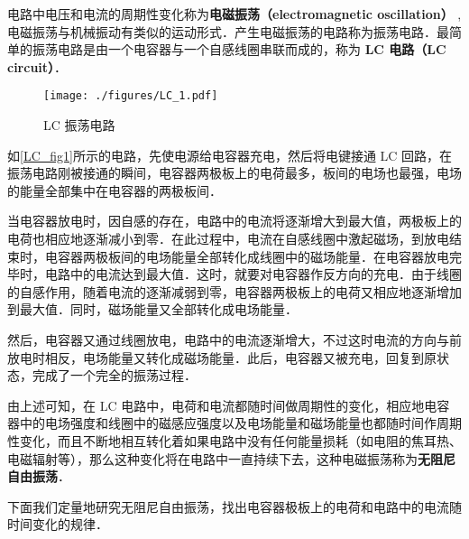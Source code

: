 
电路中电压和电流的周期性变化称为\textbf{电磁振荡（electromagnetic oscillation）} , 电磁振荡与机械振动有类似的运动形式．产生电磁振荡的电路称为振荡电路．最简单的振荡电路是由一个电容器与一个自感线圈串联而成的，称为\textbf{ LC 电路（LC circuit）}．
\begin{figure}[ht]
\centering
\texttt{[image: ./figures/LC\_1.pdf]}
\caption{LC 振荡电路} \label{LC_fig1}
\end{figure}

如\autoref{LC_fig1}所示的电路，先使电源给电容器充电，然后将电键接通 LC 回路，在振荡电路刚被接通的瞬间，电容器两极板上的电荷最多，板间的电场也最强，电场的能量全部集中在电容器的两极板间．

当电容器放电时，因自感的存在，电路中的电流将逐渐增大到最大值，两极板上的电荷也相应地逐渐减小到零．在此过程中，电流在自感线圈中激起磁场，到放电结束时，电容器两极板间的电场能量全部转化成线圈中的磁场能量．在电容器放电完毕时，电路中的电流达到最大值．这时，就要对电容器作反方向的充电．由于线圈的自感作用，随着电流的逐渐减弱到零，电容器两极板上的电荷又相应地逐渐增加到最大值．同时，磁场能量又全部转化成电场能量．

然后，电容器又通过线圈放电，电路中的电流逐渐增大，不过这时电流的方向与前放电时相反，电场能量又转化成磁场能量．此后，电容器又被充电，回复到原状态，完成了一个完全的振荡过程．

由上述可知，在 LC 电路中，电荷和电流都随时间做周期性的变化，相应地电容器中的电场强度和线圈中的磁感应强度以及电场能量和磁场能量也都随时间作周期性变化，而且不断地相互转化着如果电路中没有任何能量损耗（如电阻的焦耳热、电磁辐射等），那么这种变化将在电路中一直持续下去，这种电磁振荡称为\textbf{无阻尼自由振荡}．

下面我们定量地研究无阻尼自由振荡，找出电容器极板上的电荷和电路中的电流随时间变化的规律．

